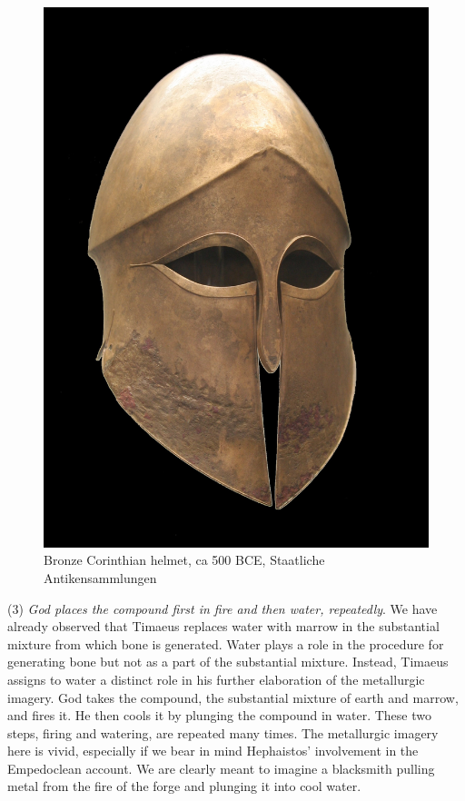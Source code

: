 \begin{figure}[htbp]
	\centering
		\includegraphics[scale=0.1]{graphics/helmet.jpg}
	\caption{Bronze Corinthian helmet, ca 500 BCE, Staatliche Antikensammlungen}
	\label{fig:helmet}
\end{figure}

(3) \emph{God places the compound first in fire and then water, repeatedly}. We have already observed that Timaeus replaces water with marrow in the substantial mixture from which bone is generated. Water plays a role in the procedure for generating bone but not as a part of the substantial mixture. Instead, Timaeus assigns to water a distinct role in his further elaboration of the metallurgic imagery. God takes the compound, the substantial mixture of earth and marrow, and fires it. He then cools it by plunging the compound in water. These two steps, firing and watering, are repeated many times. The metallurgic imagery here is vivid, especially if we bear in mind Hephaistos' involvement in the Empedoclean account. We are clearly meant to imagine a blacksmith pulling metal from the fire of the forge and plunging it into cool water. 

